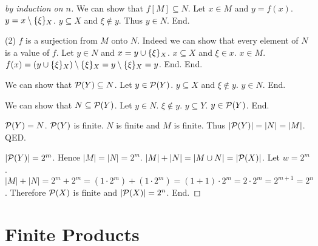 \documentclass{article}
\begin{document}
\begin{forthel}
\begin{proof}[by induction on $n$]
        We can show that $f[M] \subseteq N$.
          Let $x \in M$ and $y = f(x)$. $y = x \setminus \{\xi\}_{X}$. $y \subseteq X$ and $\xi \notin y$. Thus $y \in N$. End.
  
        (2) $f$ is a surjection from $M$ onto $N$.
        Indeed we can show that every element of $N$ is a value of $f$.
          Let $y \in N$ and $x = y \cup \{\xi\}_{X}$. $x \subseteq X$ and $\xi \in x$. $x \in M$. 
          $f(x) = (y \cup \{\xi\}_{X}) \setminus \{\xi\}_{X} = y \setminus \{\xi\}_{X} = y$. End.
      End. 
  
      We can show that ${\cal P}(Y) \subseteq N$.
        Let $y \in {\cal P}(Y)$. $y \subseteq X$ and $\xi \notin y$. $y \in N$. End.
        
      We can show that $N \subseteq {\cal P}(Y)$.
        Let $y \in N$. $\xi \notin y$. $y \subseteq Y$. $y \in {\cal P}(Y)$. End.
        
  
      ${\cal P}(Y) = N$. ${\cal P}(Y)$ is finite. $N$ is finite and $M$ is finite.
      Thus $|{\cal P}(Y)| = |N| = |M|$.
    QED.
  
    $|{\cal P}(Y)| = 2^{m}$. Hence $|M| = |N| = 2^{m}$. $|M| + |N| = |M \cup N| = |{\cal P}(X)|$. Let $w = 2^{m}$.
    $|M| + |N| = 2^{m} + 2^{m} = (1 \cdot 2^{m}) + (1 \cdot 2^{m}) = (1 + 1) \cdot 2^{m} =  2 \cdot 2^{m} = 2^{m+1} = 2^{n}$.
    Therefore ${\cal P}(X)$ is finite and $|{\cal P}(X)| = 2^{n}$.
  End.
  \end{proof}
  
  \end{forthel}
  
  

\section{Finite Products}
\end{document}
